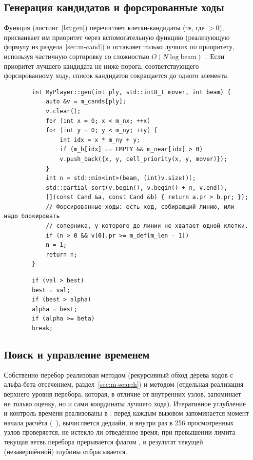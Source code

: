 \documentclass[14pt,a4paper]{extarticle}
\begin{document}
	\subsection{Генерация кандидатов и форсированные ходы}
	
	Функция  (листинг~\ref{lst:gen}) перечисляет клетки-кандидаты (те, где  $>0$), присваивает им приоритет через вспомогательную функцию  (реализующую формулу из раздела~\ref{sec:m-cand}) и оставляет только  лучших по приоритету, используя частичную сортировку  со сложностью $O(N\log \text{beam})$~\cite{cormen,cppref}. Если приоритет лучшего кандидата не ниже порога, соответствующего форсированному ходу, список кандидатов сокращается до одного элемента.
	
	\label{lst:gen}
	\begin{verbatim}
		int MyPlayer::gen(int ply, std::int8_t mover, int beam) {
			auto &v = m_cands[ply];
			v.clear();
			for (int x = 0; x < m_nx; ++x)
			for (int y = 0; y < m_ny; ++y) {
				int idx = x * m_ny + y;
				if (m_b[idx] == EMPTY && m_near[idx] > 0)
				v.push_back({x, y, cell_priority(x, y, mover)});
			}
			int n = std::min<int>(beam, (int)v.size());
			std::partial_sort(v.begin(), v.begin() + n, v.end(),
			[](const Cand &a, const Cand &b) { return a.pr > b.pr; });
			// Форсированные ходы: есть ход, собирающий линию, или надо блокировать
			// соперника, у которого до линии не хватает одной клетки.
			if (n > 0 && v[0].pr >= m_def[m_len - 1])
			n = 1;
			return n;
		}
	\end{verbatim}
	
	\label{lst:prune}
	\begin{verbatim}
		if (val > best)
		best = val;
		if (best > alpha)
		alpha = best;
		if (alpha >= beta)
		break;
	\end{verbatim}
	
	\subsection{Поиск и управление временем}
	
	Собственно перебор реализован методом  (рекурсивный обход дерева ходов с альфа-бета отсечением, раздел~\ref{sec:m-search}) и методом  (отдельная реализация верхнего уровня перебора, которая, в отличие от внутренних узлов, запоминает не только оценку, но и сами координаты лучшего хода). Итеративное углубление и контроль времени реализованы в : перед каждым вызовом запоминается момент начала расчёта (~\cite{cppref}), вычисляется дедлайн, и внутри  раз в 256 просмотренных узлов проверяется, не истекло ли отведённое время; при превышении лимита текущая ветвь перебора прерывается флагом , и результат текущей (незавершённой) глубины отбрасывается.
	
\end{document}
